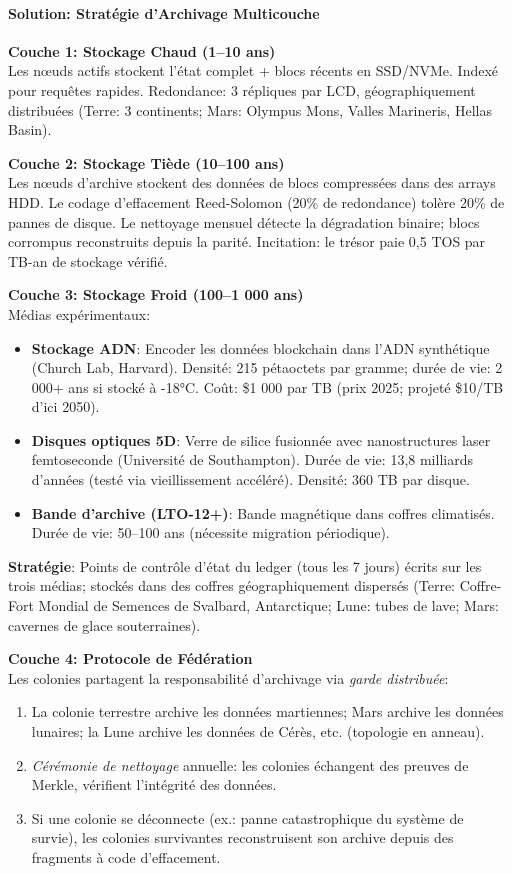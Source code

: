 \documentclass[11pt]{article}
\begin{document}
\paragraph{Solution: Stratégie d'Archivage Multicouche}

\textbf{Couche 1: Stockage Chaud (1--10 ans)}\\
Les nœuds actifs stockent l'état complet + blocs récents en SSD/NVMe. Indexé pour requêtes rapides. Redondance: 3 répliques par LCD, géographiquement distribuées (Terre: 3 continents; Mars: Olympus Mons, Valles Marineris, Hellas Basin).

\textbf{Couche 2: Stockage Tiède (10--100 ans)}\\
Les nœuds d'archive stockent des données de blocs compressées dans des arrays HDD. Le codage d'effacement Reed-Solomon (20\% de redondance) tolère 20\% de pannes de disque. Le nettoyage mensuel détecte la dégradation binaire; blocs corrompus reconstruits depuis la parité. Incitation: le trésor paie 0,5 TOS par TB-an de stockage vérifié.

\textbf{Couche 3: Stockage Froid (100--1 000 ans)}\\
Médias expérimentaux:
\begin{itemize}[noitemsep]
  \item \textbf{Stockage ADN}: Encoder les données blockchain dans l'ADN synthétique (Church Lab, Harvard). Densité: 215 pétaoctets par gramme; durée de vie: 2 000+ ans si stocké à -18°C. Coût: \$1 000 par TB (prix 2025; projeté \$10/TB d'ici 2050).
  \item \textbf{Disques optiques 5D}: Verre de silice fusionnée avec nanostructures laser femtoseconde (Université de Southampton). Durée de vie: 13,8 milliards d'années (testé via vieillissement accéléré). Densité: 360 TB par disque.
  \item \textbf{Bande d'archive (LTO-12+)}: Bande magnétique dans coffres climatisés. Durée de vie: 50--100 ans (nécessite migration périodique).
\end{itemize}
\textbf{Stratégie}: Points de contrôle d'état du ledger (tous les 7 jours) écrits sur les trois médias; stockés dans des coffres géographiquement dispersés (Terre: Coffre-Fort Mondial de Semences de Svalbard, Antarctique; Lune: tubes de lave; Mars: cavernes de glace souterraines).

\textbf{Couche 4: Protocole de Fédération}\\
Les colonies partagent la responsabilité d'archivage via \emph{garde distribuée}:
\begin{enumerate}[noitemsep]
  \item La colonie terrestre archive les données martiennes; Mars archive les données lunaires; la Lune archive les données de Cérès, etc. (topologie en anneau).
  \item \emph{Cérémonie de nettoyage} annuelle: les colonies échangent des preuves de Merkle, vérifient l'intégrité des données.
  \item Si une colonie se déconnecte (ex.: panne catastrophique du système de survie), les colonies survivantes reconstruisent son archive depuis des fragments à code d'effacement.
\end{enumerate}
\end{document}
